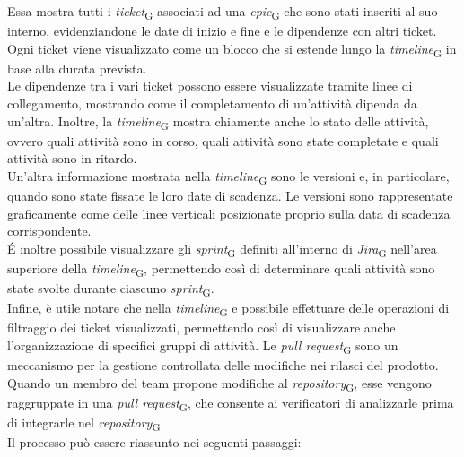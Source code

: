 Essa mostra tutti i \textit{ticket}\textsubscript{G} associati ad una \textit{epic}\textsubscript{G} che sono stati inseriti al suo interno, evidenziandone le date di inizio e fine e le dipendenze con altri ticket. Ogni ticket viene visualizzato come un blocco che si estende lungo la \textit{timeline}\textsubscript{G} in base alla durata prevista.\\
Le dipendenze tra i vari ticket possono essere visualizzate tramite linee di collegamento, mostrando come il completamento di un'attività dipenda da un’altra. Inoltre, la \textit{timeline}\textsubscript{G} mostra chiamente anche lo stato delle attività, ovvero quali attività sono in corso, quali attività sono state completate e quali attività sono in ritardo.\\
Un'altra informazione mostrata nella \textit{timeline}\textsubscript{G} sono le versioni e, in particolare, quando sono state fissate le loro date di scadenza. Le versioni sono rappresentate graficamente come delle linee verticali posizionate proprio sulla data di scadenza corrispondente.\\
\'E inoltre possibile visualizzare gli \textit{sprint}\textsubscript{G} definiti all'interno di \textit{Jira}\textsubscript{G} nell'area superiore della \textit{timeline}\textsubscript{G}, permettendo così di determinare quali attività sono state svolte durante ciascuno \textit{sprint}\textsubscript{G}.\\
Infine, è utile notare che nella \textit{timeline}\textsubscript{G} e possibile effettuare delle operazioni di filtraggio dei ticket visualizzati, permettendo così di visualizzare anche l'organizzazione di specifici gruppi di attività.
Le \textit{pull request}\textsubscript{G} sono un meccanismo per la gestione controllata delle modifiche nei rilasci del prodotto. Quando un membro del team propone modifiche al \textit{repository}\textsubscript{G}, esse vengono raggruppate in una \textit{pull request}\textsubscript{G}, che consente ai verificatori di analizzarle prima di integrarle nel \textit{repository}\textsubscript{G}.\\
Il processo può essere riassunto nei seguenti passaggi:
